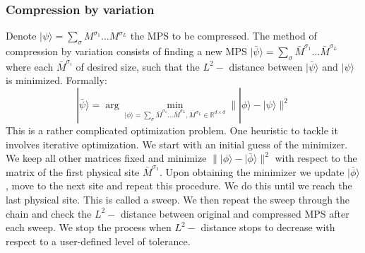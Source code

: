 \documentclass[english]{article}[12pt]
\begin{document}
\subsubsection{Compression by variation}
Denote $|\psi\rangle=\sum_{\sigma}M^{\sigma_1}\dots M^{\sigma_L}$ the MPS to be compressed. The method of compression by variation consists of finding a new MPS $|\bar\psi\rangle=\sum_{\sigma}\bar M^{\sigma_1}\dots 
 \bar M^{\sigma_L}$ where each $\bar M^{\sigma_i}$ of desired size, such that the $L^2-$ distance between $|\bar\psi\rangle$ and $|\psi\rangle$ is minimized. Formally:
 \[
|\bar\psi\rangle = \arg\min_{|\phi\rangle=\sum_{\sigma}\bar M^{\sigma_1}\dots 
 \bar M^{\sigma_L}, M^{\sigma_L} \in \mathbb{R}^{d\times d} }\||\phi \rangle-|\psi\rangle\|^2
 \]
 This is a rather complicated optimization problem. One heuristic to tackle it involves iterative optimization. We start with an initial guess of the minimizer. We keep all other matrices fixed and minimize $\||\phi \rangle-|\bar\phi\rangle\|^2$ with respect to the matrix of the first physical site $\bar M^{\sigma_1}$. Upon obtaining the minimizer we update $|\bar\phi\rangle$, move to the next site and repeat this procedure. We do this until we reach the last physical site. This is called a sweep. We then repeat the sweep through the chain and check the $L^2-$ distance between original and compressed MPS after each sweep. We stop the process when $L^2-$ distance stops to decrease with respect to a user-defined level of tolerance.
\end{document}
